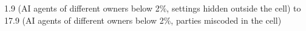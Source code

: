 1.9 (AI agents of different owners below 2\%, settings hidden outside the cell) to 17.9 (AI agents of different owners below 2\%, parties miscoded in the cell)